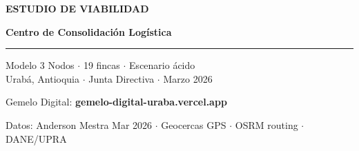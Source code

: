 \documentclass[aspectratio=169, 10pt]{beamer}
\begin{document}
\begin{frame}[plain]
\vfill
\begin{center}
\vspace{4pt}

{\Large\color{verde}\textbf{ESTUDIO DE VIABILIDAD}}
\vspace{2pt}

{\fontsize{24}{28}\selectfont\textbf{Centro de Consolidaci\'on Log\'istica}\par}
\vspace{2pt}
\rule{3cm}{1pt}
\vspace{3pt}

{\small\color{gris} Modelo 3 Nodos $\cdot$ 19 fincas $\cdot$ Escenario \'acido}\\[2pt]
{\small\color{gris} Urab\'a, Antioquia $\cdot$ Junta Directiva $\cdot$ Marzo 2026}
\vspace{10pt}

\colorbox{grisclaro}{\small\strut\hspace{4pt}Gemelo Digital: \textcolor{verde}{\textbf{gemelo-digital-uraba.vercel.app}}\hspace{4pt}}
\vspace{6pt}

{\tiny\color{gris} Datos: Anderson Mestra Mar 2026 $\cdot$ Geocercas GPS $\cdot$ OSRM routing $\cdot$ DANE/UPRA}
\end{center}
\vfill
\end{frame}
\end{document}
